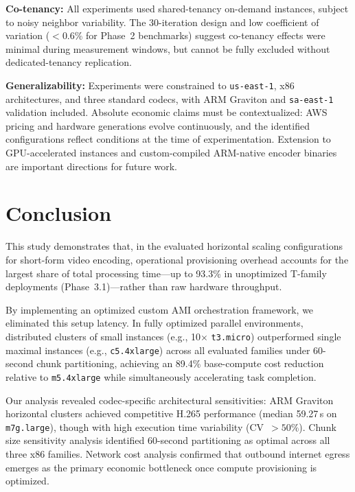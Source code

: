 \documentclass[conference]{IEEEtran}
\begin{document}
\textbf{Co-tenancy:} All experiments used shared-tenancy on-demand instances, subject to noisy neighbor variability. The 30-iteration design and low coefficient of variation ($<$0.6\% for Phase~2 benchmarks) suggest co-tenancy effects were minimal during measurement windows, but cannot be fully excluded without dedicated-tenancy replication.

\textbf{Generalizability:} Experiments were constrained to \texttt{us-east-1}, x86 architectures, and three standard codecs, with ARM Graviton and \texttt{sa-east-1} validation included. Absolute economic claims must be contextualized: AWS pricing and hardware generations evolve continuously, and the identified configurations reflect conditions at the time of experimentation. Extension to GPU-accelerated instances and custom-compiled ARM-native encoder binaries are important directions for future work.

\section{Conclusion}
\label{conclusion}

This study demonstrates that, in the evaluated horizontal scaling configurations for short-form video encoding, operational provisioning overhead accounts for the largest share of total processing time---up to 93.3\% in unoptimized T-family deployments (Phase~3.1)---rather than raw hardware throughput.

By implementing an optimized custom AMI orchestration framework, we eliminated this setup latency. In fully optimized parallel environments, distributed clusters of small instances (e.g., 10$\times$ \texttt{t3.micro}) outperformed single maximal instances (e.g., \texttt{c5.4xlarge}) across all evaluated families under 60-second chunk partitioning, achieving an 89.4\% base-compute cost reduction relative to \texttt{m5.4xlarge} while simultaneously accelerating task completion.

Our analysis revealed codec-specific architectural sensitivities: ARM Graviton horizontal clusters achieved competitive H.265 performance (median 59.27\,s on \texttt{m7g.large}), though with high execution time variability (CV~$>50\%$). Chunk size sensitivity analysis identified 60-second partitioning as optimal across all three x86 families. Network cost analysis confirmed that outbound internet egress emerges as the primary economic bottleneck once compute provisioning is optimized.
\end{document}
